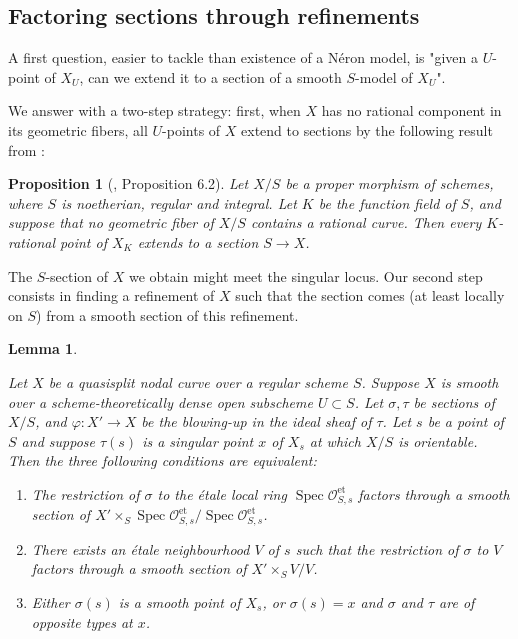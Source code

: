 \documentclass[a4paper,12pt]{amsart} %
\numberwithin{equation}{subsection}
\newcommand{\on}[1]{\operatorname{#1}}
\newcommand{\Spec}{\operatorname{Spec}}
\theoremstyle{definition}
\theoremstyle{plain}%
\newtheorem{proposition}[definition]{Proposition}
\newtheorem{lemma}[definition]{Lemma}
\theoremstyle{remark}
\renewcommand{\phi}{\varphi}
\renewcommand{\O}{\mathcal{O}}
\begin{document}
\subsection{Factoring sections through refinements}\label{Factoring sections through refinements}
A first question, easier to tackle than existence of a N\'eron model, is "given a $U$-point of $X_U$, can we extend it to a section of a smooth $S$-model of $X_U$".

We answer with a two-step strategy: first, when $X$ has no rational component in its geometric fibers, all $U$-points of $X$ extend to sections by the following result from \cite{HypersurfacesMovingLemma}:
\begin{proposition}[\cite{HypersurfacesMovingLemma}, Proposition 6.2]\label{pas de courbe rationnelle ==> les points rationnels s'étendent en sections}
	Let $X/S$ be a proper morphism of schemes, where $S$ is noetherian, regular and integral. Let $K$ be the function field of $S$, and suppose that no geometric fiber of $X/S$ contains a rational curve. Then every $K$-rational point of $X_K$ extends to a section $S\to X$.
\end{proposition}

The $S$-section of $X$ we obtain might meet the singular locus. Our second step consists in finding a refinement of $X$ such that the section comes (at least locally on $S$) from a smooth section of this refinement.


\begin{lemma}\label{lemme condition pour factoriser une section par un raffinement asymetrique}
	
	Let $X$ be a quasisplit nodal curve over a regular scheme $S$. Suppose $X$ is smooth over a scheme-theoretically dense open subscheme $U\subset S$. Let $\sigma,\tau$ be sections of $X/S$, and $\phi\colon X'\to X$ be the blowing-up in the ideal sheaf of $\tau$. Let $s$ be a point of $S$ and suppose $\tau(s)$ is a singular point $x$ of $X_s$ at which $X/S$ is orientable. Then the three following conditions are equivalent:
	\begin{enumerate}
	\item The restriction of $\sigma$ to the \'etale local ring $\Spec\O_{S,s}^{\on{et}}$ factors through a smooth section of $X'\times_S \Spec\O_{S,s}^{\on{et}}/\Spec\O_{S,s}^{\on{et}}$.
	\item There exists an \'etale neighbourhood $V$ of $s$ such that the restriction of $\sigma$ to $V$ factors through a smooth section of $X'\times_S V/V$.
	\item Either $\sigma(s)$ is a smooth point of $X_s$, or $\sigma(s)=x$ and $\sigma$ and $\tau$ are of opposite types at $x$.
	\end{enumerate}
\end{lemma}
\end{document}

